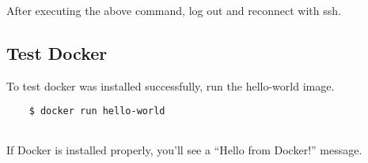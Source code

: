 After executing the above command, log out and reconnect with ssh.

\subsection{Test Docker}

To test docker was installed successfully, run the hello-world image.

\begin{lstlisting}
    $ docker run hello-world
            
\end{lstlisting}

If Docker is installed properly, you'll see a ``Hello from Docker!''
message.

